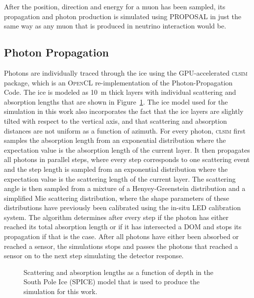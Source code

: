 After the position, direction and energy for a muon has been sampled, its propagation and photon production is simulated using \textsc{PROPOSAL} in just the same way as any muon that is produced in neutrino interaction would be.


\subsection{Photon Propagation}
\label{sec:photon-propagation}

Photons are individually traced through the ice using the GPU-accelerated \textsc{clsim}\cite{clsim} package, which is an \textsc{OpenCL} re-implementation of the Photon-Propagation Code.  The ice is modeled as 10~m thick layers with individual scattering and absorption lengths that are shown in Figure~\ref{fig:spice-model}. The ice model used for the simulation in this work also incorporates the fact that the ice layers are slightly tilted with respect to the vertical axis, and that scattering and absorption distances are not uniform as a function of azimuth. For every photon, \textsc{clsim} first samples the absorption length from an exponential distribution where the expectation value is the absorption length of the current layer. It then propagates all photons in parallel steps, where every step corresponds to one scattering event and the step length is sampled from an exponential distribution where the expectation value is the scattering length of the current layer. The scattering angle is then sampled from a mixture of a Henyey-Greenstein distribution and a simplified Mie scattering distribution, where the shape parameters of these distributions have previously been calibrated using the in-situ LED calibration system. The algorithm determines after every step if the photon has either reached its total absorption length or if it has intersected a DOM and stops its propagation if that is the case. After all photons have either been absorbed or reached a sensor, the simulations stops and passes the photons that reached a sensor on to the next step simulating the detector response.

\begin{figure}
    \centering
    
    \caption{Scattering and absorption lengths as a function of depth in the South Pole Ice (SPICE) model that is used to produce the simulation for this work.}
    \label{fig:spice-model}
\end{figure}


